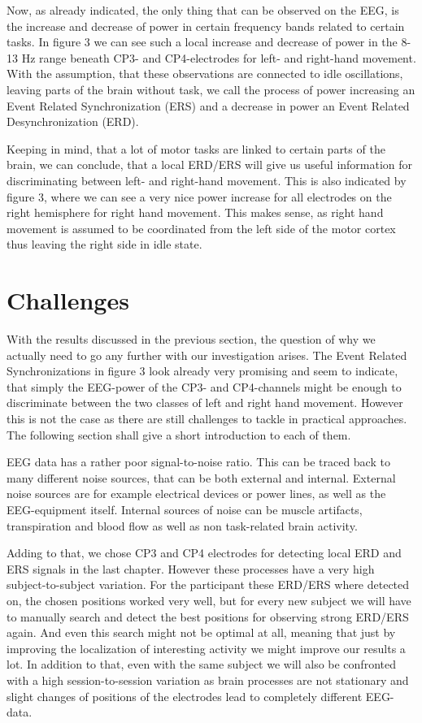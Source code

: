 \documentclass[12pt,twoside,twocolumn]{article}
\begin{document}
Now, as already indicated, the only thing that can be observed on the EEG, is the increase and decrease of power in certain frequency bands related to certain tasks. In figure 3 we can see such a local increase and decrease of power in the 8-13 Hz range beneath CP3- and CP4-electrodes for left- and right-hand movement. With the assumption, that these observations are connected to idle oscillations, leaving parts of the brain without task, we  call the process of power increasing an Event Related Synchronization (ERS) and a decrease in power an Event Related Desynchronization (ERD).

Keeping in mind, that a lot of motor tasks are linked to certain parts of the brain, we can conclude, that a local ERD/ERS will give us useful information for discriminating between left- and right-hand movement. This is also indicated by figure 3, where we can see a very nice power increase for all electrodes on the right hemisphere for right hand movement. This makes sense, as right hand movement is assumed to be coordinated from the left side of the motor cortex thus leaving the right side in idle state. 

\section{Challenges}
With the results discussed in the previous section, the question of why we actually need to go any further with our investigation arises. The Event Related Synchronizations in figure 3 look already very promising and seem to indicate, that simply the EEG-power of the CP3- and CP4-channels might be enough to discriminate between the two classes of left and right hand movement. However this is not the case as there are  still challenges to tackle in practical approaches. The following section shall give a short introduction to each of them.

EEG data has a rather poor signal-to-noise ratio. This can be traced back to many different noise sources, that can be both external and internal. External noise sources are for example  electrical devices or power lines, as well as the EEG-equipment itself. Internal sources of noise can be muscle artifacts, transpiration and blood flow as well as non task-related brain activity. 

Adding to that, we chose CP3 and CP4 electrodes for detecting local ERD and ERS signals in the last chapter. However these processes have a very high subject-to-subject variation. For the participant these ERD/ERS where detected on, the chosen positions worked very well, but for every new subject we will have to manually search and detect the best positions for observing strong ERD/ERS again. And even this search might not be optimal at all, meaning that just by improving the localization of interesting activity we might improve our results a lot. In addition to that, even with the same subject we will also be confronted with a high session-to-session variation as brain processes are not stationary and slight changes of positions of the electrodes lead to completely different EEG-data.
\end{document}
